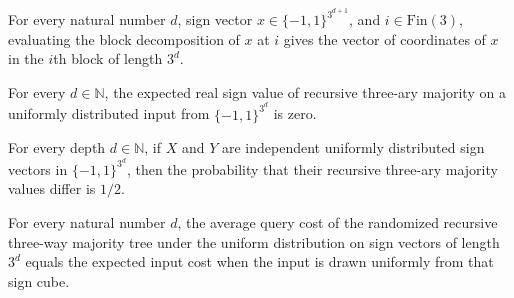 \begin{theorem}
\label{FABL.recursiveMajorityThreeBlocksEquiv_apply}
\leanok
{}
For every natural number $d$, sign vector $x\in\{−1,1\}^{3^{d+1}}$, and
$i\in\text{Fin}(3)$, evaluating the block decomposition of $x$ at $i$ gives the vector
of coordinates of $x$ in the $i$th block of length $3^d$.
\end{theorem}

\begin{theorem}
\label{FABL.expect_recursiveMajorityThree_toReal_eq_zero}
\leanok
{}
For every $d\in\mathbb N$, the expected real sign value of recursive three-ary majority
on a uniformly distributed input from $\{−1,1\}^{3^d}$ is zero.
\end{theorem}

\begin{theorem}
\label{FABL.expect_recursiveMajorityThree_disagreement}
\leanok
{}
For every depth $d\in\mathbb N$, if $X$ and $Y$ are independent uniformly distributed
sign vectors in $\{−1,1\}^{3^d}$, then the probability that their recursive three-ary
majority values differ is $1/2$.
\end{theorem}

\begin{theorem}
\label{FABL.recursiveMajorityThreeRandomizedTree_averageCost_eq_expect}
\leanok
{}
For every natural number $d$, the average query cost of the randomized recursive
three-way majority tree under the uniform distribution on sign vectors of length $3^d$
equals the expected input cost when the input is drawn uniformly from that sign cube.
\end{theorem}

